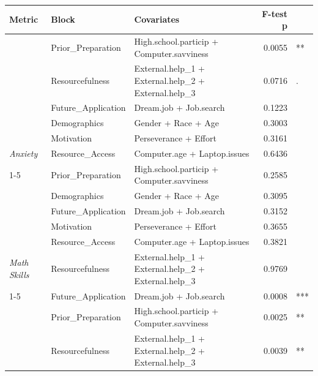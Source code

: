 \begin{table}[!h]
\centering
\begin{threeparttable}
\begin{tabular}[t]{>{}lllrl}
\toprule
\textbf{Metric} & \textbf{Block} & \textbf{Covariates} & \textbf{F-test p} & \textbf{}\\
\midrule
 & Prior_Preparation & High.school.particip + Computer.savviness & 0.0055 & **\\

 & Resourcefulness & External.help_1 + External.help_2 + External.help_3 & 0.0716 & .\\

 & Future_Application & Dream.job + Job.search & 0.1223 & \\

 & Demographics & Gender + Race + Age & 0.3003 & \\

 & Motivation & Perseverance + Effort & 0.3161 & \\

\multirow[t]{-5}{*}[\normalbaselineskip]{\raggedright\arraybackslash \em{Anxiety}} & Resource_Access & Computer.age + Laptop.issues & 0.6436 & \\
\cmidrule{1-5}
 & Prior_Preparation & High.school.particip + Computer.savviness & 0.2585 & \\

 & Demographics & Gender + Race + Age & 0.3095 & \\

 & Future_Application & Dream.job + Job.search & 0.3152 & \\

 & Motivation & Perseverance + Effort & 0.3655 & \\

 & Resource_Access & Computer.age + Laptop.issues & 0.3821 & \\

\multirow[t]{-5}{*}[\normalbaselineskip]{\raggedright\arraybackslash \em{Math Skills}} & Resourcefulness & External.help_1 + External.help_2 + External.help_3 & 0.9769 & \\
\cmidrule{1-5}
 & Future_Application & Dream.job + Job.search & 0.0008 & ***\\

 & Prior_Preparation & High.school.particip + Computer.savviness & 0.0025 & **\\

 & Resourcefulness & External.help_1 + External.help_2 + External.help_3 & 0.0039 & **\\


\end{tabular}
\end{threeparttable}
\end{table}
